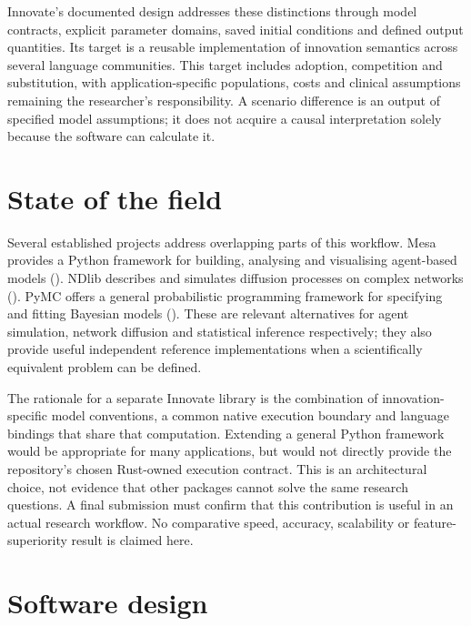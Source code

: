 \documentclass[10pt,a4paper,onecolumn]{article}
\begin{document}
Innovate's documented design addresses these distinctions through model
contracts, explicit parameter domains, saved initial conditions and
defined output quantities. Its target is a reusable implementation of
innovation semantics across several language communities. This target
includes adoption, competition and substitution, with
application-specific populations, costs and clinical assumptions
remaining the researcher's responsibility. A scenario difference is an
output of specified model assumptions; it does not acquire a causal
interpretation solely because the software can calculate it.

\section{State of the field}\label{state-of-the-field}

Several established projects address overlapping parts of this workflow.
Mesa provides a Python framework for building, analysing and visualising
agent-based models ().
NDlib describes and simulates diffusion processes on complex networks
(). PyMC offers a general
probabilistic programming framework for specifying and fitting Bayesian
models (). These are
relevant alternatives for agent simulation, network diffusion and
statistical inference respectively; they also provide useful independent
reference implementations when a scientifically equivalent problem can
be defined.

The rationale for a separate Innovate library is the combination of
innovation-specific model conventions, a common native execution
boundary and language bindings that share that computation. Extending a
general Python framework would be appropriate for many applications, but
would not directly provide the repository's chosen Rust-owned execution
contract. This is an architectural choice, not evidence that other
packages cannot solve the same research questions. A final submission
must confirm that this contribution is useful in an actual research
workflow. No comparative speed, accuracy, scalability or
feature-superiority result is claimed here.

\section{Software design}\label{software-design}
\end{document}
